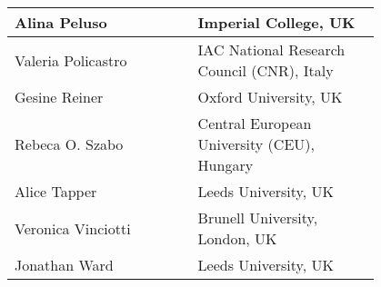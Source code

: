 \begin{center}
\begin{longtable}{p{0.4\linewidth} p{0.4\linewidth} }
Alina	Peluso &	Imperial College, UK  \\ \hline
Valeria	Policastro &	IAC  National Research Council (CNR), Italy  \\ \hline
Gesine	Reiner	& Oxford University, UK  \\ \hline
Rebeca O.	Szabo & Central European University (CEU), Hungary  \\ \hline
Alice	Tapper &	Leeds University, UK  \\ \hline
Veronica	Vinciotti	& Brunell University, London, UK  \\ \hline
Jonathan	Ward	& Leeds University, UK  \\ \hline


\end{longtable}
\end{center}